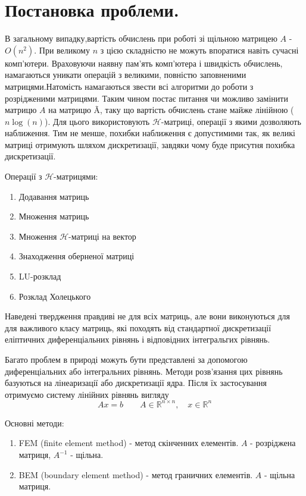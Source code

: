 \documentclass[12pt]{report}
\begin{document}
\section{ Постановка проблеми.}
	\hspace{0.8cm} В загальному випадку,вартість обчислень при роботі зі щільною матрицею $A$ - $O(n^2)$. При великому $n$ з цією складністю не можуть впоратися навіть сучасні комп'ютери. Враховуючи наявну пам'ять комп'ютера і швидкість обчислень, намагаються уникати операцій з великими, повністю заповненими матрицями.Натомість намагаються звести всі алгоритми до роботи з розрідженими матрицями. Таким чином постає питання чи можливо замінити матрицю $A$ на матрицю \~A, таку що вартість обчислень стане майже лінійною ($n\log(n)$). Для цього використовують $\mathcal{H}$-матриці, операції з якими дозволяють наближення. Тим не менше, похибки наближення є допустимими так, як великі матриці отримують шляхом дискретизації, завдяки чому буде присутня похибка дискретизації.
	\par Операції з $\mathcal{H}$-матрицями:
	\begin{enumerate}
		\item Додавання матриць
		\item Множення матриць
		\item Множення $\mathcal{H}$-матриці на вектор
		\item Знаходження оберненої матриці
		\item LU-розклад
		\item Розклад Холецького
	\end{enumerate}
	\par Наведені твердження правдиві не для всіх матриць, але вони виконуються для для важливого класу матриць, які походять від стандартної дискретизації еліптичних диференціальних рівнянь і відповідних інтегральгих рівнянь.
	\par Багато проблем в природі можуть бути представлені за допомогою диференціальних або інтегральних рівнянь. Методи розв'язання цих рівнянь базуються на лінеаризації або дискретизації ядра. Після їх застосування отримуємо систему лінійних рівнянь вигляду 
		 $$ Ax=b \quad\quad   A \in \mathbb{R}^{n\times n},\quad   x\in \mathbb{R}^n$$ \newline
    \par Основні методи:
	\begin{enumerate}
		\item FEM (finite element method) - метод скінченних елементів. $A$ - розріджена матриця, $A^{-1}$ - щільна.
		\item BEM (boundary element method) - метод граничних елементів. $A$ - щільна матриця.
	\end{enumerate}
	
\end{document}
